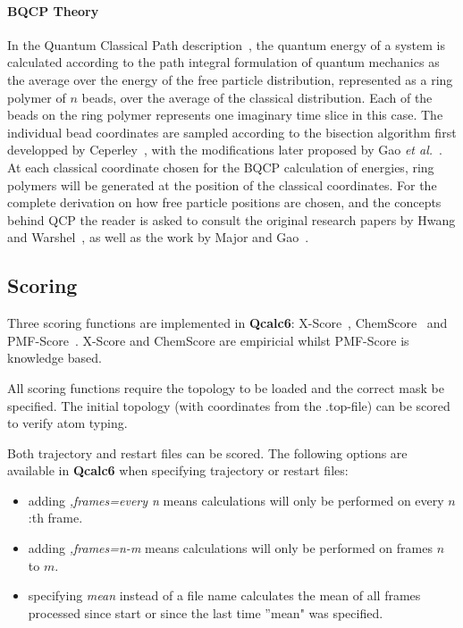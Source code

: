 \documentclass[a4paper,11pt]{article}
\newcommand{\dirfig}{./pictures}
\let\origcite\cite
\def\cite#1{\unskip~\origcite{#1}}
\begin{document}
\paragraph{BQCP Theory}
In the Quantum Classical Path description\cite{Hwang1993}, the quantum energy of a system is calculated according to the
path integral formulation of quantum mechanics as the average
over the energy of the free particle distribution, represented as a ring polymer of $n$ beads, over
the average of the classical distribution. Each of the beads on the ring polymer represents one
imaginary time slice in this case. The individual bead coordinates are sampled according to the bisection
algorithm first developped by Ceperley\cite{Ceperley1995}, with the modifications later proposed by 
Gao \emph{et al.}\cite{Gao2008}. At each classical coordinate chosen for the BQCP
calculation of energies, ring polymers will be generated at the position of the classical coordinates.
For the complete derivation on how free particle positions are chosen, and the concepts behind
QCP the reader is asked to consult the original research papers by Hwang and Warshel\cite{Hwang1993}, as well
as the work by Major and Gao\cite{Major2007a,Gao2008}.

\clearpage
\subsection{Scoring}\label{subsection:scoring} 
Three   scoring   functions   are   implemented   in   \textbf{Qcalc6}:
X-Score\cite{Wang2002},       ChemScore\cite{Eldridge1997}       and
PMF-Score\cite{Muegge1999}.   X-Score  and ChemScore  are  empiricial
whilst PMF-Score is knowledge based.

All  scoring functions  require  the  topology to  be  loaded and  the
correct mask be specified. The initial topology (with coordinates from
the .top-file) can be scored to verify atom typing.

Both trajectory and restart files can be scored. The following options
are available in \textbf{Qcalc6}  when specifying trajectory or restart
files:
\begin{itemize}
  \item{adding \emph{,frames=every n} means  calculations will only be
performed on every $n$:th frame.}
  \item{adding  \emph{,frames=n-m}  means  calculations will  only  be
performed on frames $n$ to $m$.}
  \item{specifying \emph{mean}  instead of a file  name calculates the
mean  of all  frames  processed since  start or  since  the last  time
''mean" was specified.}
\end{itemize}
\end{document}
